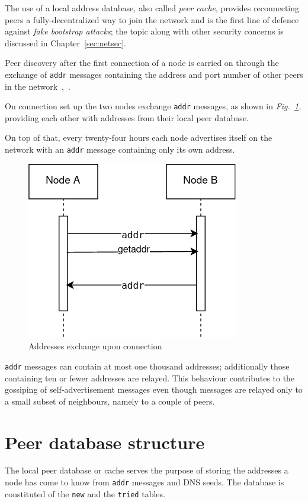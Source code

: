 The use of a local address database, also called \emph{peer cache}, provides reconnecting peers a fully-decentralized way to join the network and is the first line of defence against \emph{fake bootstrap attacks}; the topic along with other security concerns is discussed in Chapter~\ref{sec:netsec}.\par

Peer discovery after the first connection of a node is carried on through the exchange of \texttt{addr} messages containing the address and port number of other peers in the network~\cite{protocoldoc},~\cite{devguidep2p}.

On connection set up the two nodes exchange \texttt{addr} messages, as shown in \emph{Fig.~\ref{fig:addr}}, providing each other with addresses from their local peer database.

On top of that, every twenty-four hours each node advertises itself on the network with an \texttt{addr} message containing only its own address.

\begin{figure}[h]
	\includegraphics[width=.45\textwidth]{pict/BTCaddr.png}
	\centering
	\caption{Addresses exchange upon connection}
	\label{fig:addr}
\end{figure}

\texttt{addr} messages can contain at most one thousand addresses; additionally those containing ten or fewer addresses are relayed. This behaviour contributes to the gossiping of self-advertisement messages even though messages are relayed only to a small subset of neighbours, namely to a couple of peers.

\section{Peer database structure}\label{sec:cachestruct}
The local peer database or cache serves the purpose of storing the addresses a node has come to know from \texttt{addr} messages and DNS seeds. The database is constituted of the \texttt{new} and the \texttt{tried} tables.


